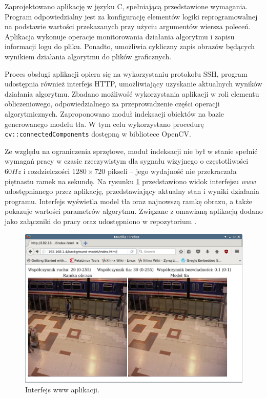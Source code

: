 Zaprojektowano aplikację w języku C, spełniającą przedstawione wymagania.
Program odpowiedzialny jest za konfigurację elementów logiki reprogramowalnej na podstawie wartości przekazanych przy użyciu argumentów wiersza poleceń. 
Aplikacja wykonuje operacje monitorowania działania algorytmu i zapisu informacji logu do pliku. 
Ponadto, umożliwia cykliczny zapis obrazów będących wynikiem działania algorytmu do plików graficznych. 

Proces obsługi aplikacji opiera się na wykorzystaniu protokołu SSH, program udostępnia również interfejs HTTP, umożliwiający uzyskanie aktualnych wyników działania algorytmu.
Zbadano możliwość wykorzystania aplikacji w roli elementu obliczeniowego, odpowiedzialnego za przeprowadzenie części operacji algorytmicznych. 
Zaproponowano moduł indeksacji obiektów na bazie generowanego modelu tła. 
W tym celu wykorzystano procedurę \texttt{cv::connectedComponents} dostępną w bibliotece OpenCV. 

Ze względu na ograniczenia sprzętowe, moduł indeksacji nie był w stanie spełnić wymagań pracy w czasie rzeczywistym dla sygnału wizyjnego o częstotliwości $60Hz$ i rozdzielczości $1280 \times 720 $ pikseli -- jego wydajność nie przekraczała piętnastu ramek na sekundę.
Na rysunku \ref{fig:background-buffer-www} przedstawiono widok interfejsu \emph{www} udostępnianego przez aplikację, przedstawiający aktualny stan i wyniki działania programu. Interfejs wyświetla model tła oraz najnowszą ramkę obrazu, a także pokazuje wartości parametrów algorytmu.
Związane z omawianą aplikacją dodano jako załączniki do pracy oraz udostępniono w repozytorium \cite{git-repository}.
\begin{figure}[!htb]
	\centering
	\includegraphics[width=12cm]{img/www-iface.png}
	\caption{Interfejs www aplikacji.}
	\label{fig:background-buffer-www}
\end{figure}
